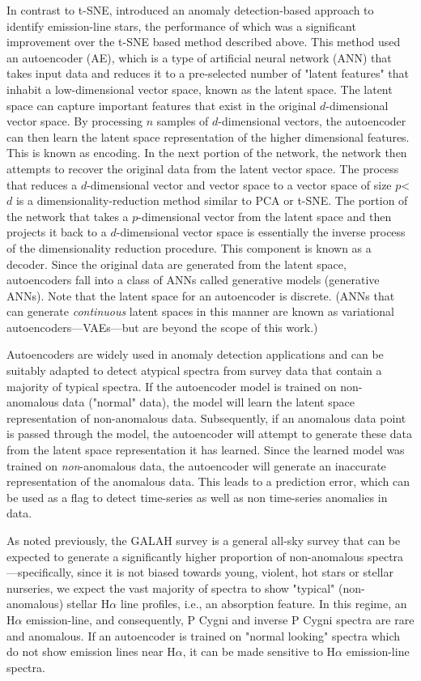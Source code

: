In contrast to t-SNE, \citet{vcotar2021galah} introduced an anomaly detection-based approach to identify emission-line stars, the performance of which was a significant improvement over the t-SNE based method described above. This method used an autoencoder (AE), which is a type of artificial neural network (ANN) that takes input data and reduces it to a pre-selected number of "latent features" that inhabit a low-dimensional vector space, known as the latent space. The latent space can capture important features that exist in the original $d$-dimensional vector space. By processing $n$ samples of $d$-dimensional vectors, the autoencoder can then learn the latent space representation of the higher dimensional features. This is known as encoding. In the next portion of the network, the network then attempts to recover the original data from the latent vector space. The process that reduces a $d$-dimensional vector and vector space to a vector space of size $p$<$d$ is a dimensionality-reduction method similar to PCA or t-SNE. The portion of the network that takes a $p$-dimensional vector from the latent space and then projects it back to a $d$-dimensional vector space is essentially the inverse process of the dimensionality reduction procedure. This component is known as a decoder. Since the original data are generated from the latent space, autoencoders fall into a class of ANNs called generative models (generative ANNs). Note that the latent space for an autoencoder is discrete. (ANNs that can generate {\em continuous} latent spaces in this manner are known as variational autoencoders—VAEs—but are beyond the scope of this work.) 

Autoencoders are widely used in anomaly detection applications \citep{sakurada2014anomaly} and can be suitably adapted to detect atypical spectra from survey data that contain a majority of typical spectra. If the autoencoder model is trained on non-anomalous data ("normal" data), the model will learn the latent space representation of non-anomalous data. Subsequently, if an anomalous data point is passed through the model, the autoencoder will attempt to generate these data from the latent space representation it has learned. Since the learned model was trained on {\em non}-anomalous data, the autoencoder will generate an inaccurate representation of the anomalous data. This leads to a prediction error, which can be used as a flag to detect time-series as well as non time-series anomalies in data.

As noted previously, the GALAH survey is a general all-sky survey that can be expected to generate a significantly higher proportion of non-anomalous spectra—specifically, since it is not biased towards young, violent, hot stars or stellar nurseries, we expect the vast majority of spectra to show "typical" (non-anomalous) stellar H$\alpha$ line profiles, i.e., an absorption feature. In this regime, an H$\alpha$ emission-line, and consequently, P Cygni and inverse P Cygni spectra are rare and anomalous. If an autoencoder is trained on "normal looking" spectra which do not show emission lines near H$\alpha$, it can be made sensitive to H$\alpha$ emission-line spectra. 

